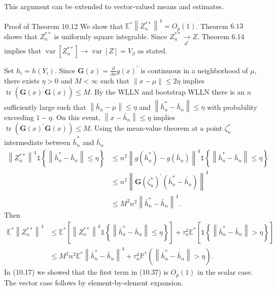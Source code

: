 \documentclass[10pt]{article}
\begin{document}
This argument can be extended to vector-valued means and estimates.

Proof of Theorem 10.12 We show that $\mathbb{E}^{*}\left\|Z_{n}^{* *}\right\|^{4}=O_{p}(1)$. Theorem $6.13$ shows that $Z_{n}^{* *}$ is uniformly square integrable. Since $Z_{n}^{* *} \underset{d^{*}}{\longrightarrow} Z$, Theorem $6.14$ implies that $\operatorname{var}\left[Z_{n}^{* *}\right] \rightarrow \operatorname{var}[Z]=V_{\beta}$ as stated.

Set $h_{i}=h\left(Y_{i}\right)$. Since $\boldsymbol{G}(x)=\frac{\partial}{\partial x} g(x)^{\prime}$ is continuous in a neighborhood of $\mu$, there exists $\eta>0$ and $M<\infty$ such that $\|x-\mu\| \leq 2 \eta$ implies $\operatorname{tr}\left(\boldsymbol{G}(x)^{\prime} \boldsymbol{G}(x)\right) \leq M$. By the WLLN and bootstrap WLLN there is an $n$ sufficiently large such that $\left\|\bar{h}_{n}-\mu\right\| \leq \eta$ and $\left\|\bar{h}_{n}^{*}-\bar{h}_{n}\right\| \leq \eta$ with probability exceeding $1-\eta$. On this event, $\left\|x-\bar{h}_{n}\right\| \leq \eta$ implies $\operatorname{tr}\left(\boldsymbol{G}(x)^{\prime} \boldsymbol{G}(x)\right) \leq M$. Using the mean-value theorem at a point $\zeta_{n}^{*}$ intermediate between $\bar{h}_{n}^{*}$ and $\bar{h}_{n}$
$$
\begin{aligned}
\left\|Z_{n}^{* *}\right\|^{4} \mathbb{1}\left\{\left\|\bar{h}_{n}^{*}-\bar{h}_{n}\right\| \leq \eta\right\} & \leq n^{2}\left\|g\left(\bar{h}_{n}^{*}\right)-g\left(\bar{h}_{n}\right)\right\|^{4} \mathbb{1}\left\{\left\|\bar{h}_{n}^{*}-\bar{h}_{n}\right\| \leq \eta\right\} \\
& \leq n^{2}\left\|\boldsymbol{G}\left(\zeta_{n}^{*}\right)^{\prime}\left(\bar{h}_{n}^{*}-\bar{h}_{n}\right)\right\|^{4} \\
& \leq M^{2} n^{2}\left\|\bar{h}_{n}^{*}-\bar{h}_{n}\right\|^{4} .
\end{aligned}
$$
Then
$$
\begin{aligned}
\mathbb{E}^{*}\left\|Z_{n}^{* *}\right\|^{4} & \leq \mathbb{E}^{*}\left[\left\|Z_{n}^{* *}\right\|^{4} \mathbb{1}\left\{\left\|\bar{h}_{n}^{*}-\bar{h}_{n}\right\| \leq \eta\right\}\right]+\tau_{n}^{4} \mathbb{E}^{*}\left[\mathbb{1}\left\{\left\|\bar{h}_{n}^{*}-\bar{h}_{n}\right\|>\eta\right\}\right] \\
& \leq M^{2} n^{2} \mathbb{E}^{*}\left\|\bar{h}_{n}^{*}-\bar{h}_{n}\right\|^{4}+\tau_{n}^{4} \mathbb{P}^{*}\left(\left\|\bar{h}_{n}^{*}-\bar{h}_{n}\right\|>\eta\right) .
\end{aligned}
$$
In (10.17) we showed that the first term in (10.37) is $O_{p}(1)$ in the scalar case. The vector case follows by element-by-element expansion.
\end{document}
